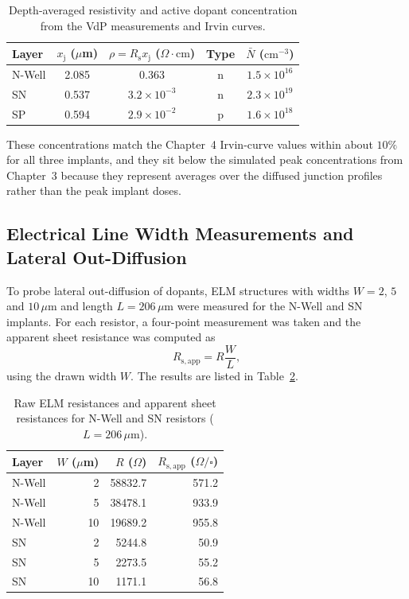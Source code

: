\begin{table}[htbp]
  \centering
  \caption{Depth-averaged resistivity and active dopant concentration from the VdP measurements and Irvin curves.}
  \label{tab:ch7-vdp-conc}
  \begin{tabular}{lcccc}
    \toprule
    Layer & $x_\mathrm{j}$ ($\mu$m) & $\rho = R_\mathrm{s}x_\mathrm{j}$ ($\Omega\cdot\mathrm{cm}$) & Type & $\bar N$ ($\mathrm{cm}^{-3}$) \\
    \midrule
    N-Well & 2.085 & 0.363            & n & $1.5\times10^{16}$ \\
    SN     & 0.537 & $3.2\times10^{-3}$ & n & $2.3\times10^{19}$ \\
    SP     & 0.594 & $2.9\times10^{-2}$ & p & $1.6\times10^{18}$ \\
    \bottomrule
  \end{tabular}
\end{table}

These concentrations match the Chapter~4 Irvin-curve values within about $10\%$ for all three implants, and they sit below the simulated peak concentrations from Chapter~3 because they represent averages over the diffused junction profiles rather than the peak implant doses.
\subsection{Electrical Line Width Measurements and Lateral Out-Diffusion}

To probe lateral out-diffusion of dopants, ELM structures with widths $W = 2$, $5$ and $10\,\mu\mathrm{m}$ and length $L = 206\,\mu\mathrm{m}$ were measured for the N-Well and SN implants. For each resistor, a four-point measurement was taken and the apparent sheet resistance was computed as
\[
  R_\mathrm{s,app} = R \frac{W}{L},
\]
using the drawn width $W$. The results are listed in Table~\ref{tab:ch7-elm-raw}.

\begin{table}[htbp]
  \centering
  \caption{Raw ELM resistances and apparent sheet resistances for N-Well and SN resistors ($L = 206\,\mu\mathrm{m}$).}
  \label{tab:ch7-elm-raw}
  \begin{tabular}{lrrr}
    \toprule
    Layer & $W$ ($\mu$m) & $R$ ($\Omega$) & $R_\mathrm{s,app}$ ($\Omega/\square$) \\
    \midrule
    N-Well &  2 & 58832.7 & 571.2 \\
    N-Well &  5 & 38478.1 & 933.9 \\
    N-Well & 10 & 19689.2 & 955.8 \\
    SN     &  2 &  5244.8 &  50.9 \\
    SN     &  5 &  2273.5 &  55.2 \\
    SN     & 10 &  1171.1 &  56.8 \\
    \bottomrule
  \end{tabular}
\end{table}

